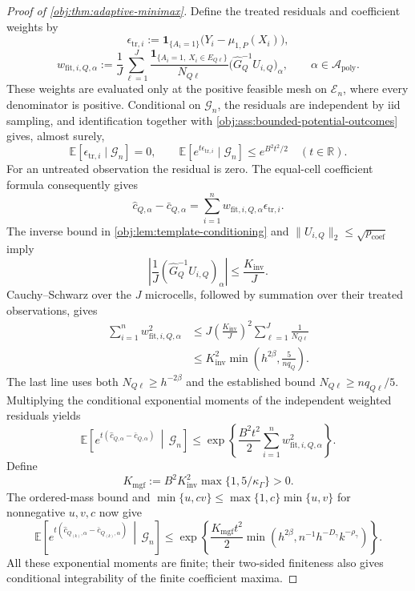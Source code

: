 \begin{proof}[Proof of \cref{obj:thm:adaptive-minimax}]
Define the treated residuals and coefficient weights by
\[
\epsilon_{\mathrm{tr},i}
:=\mathbf1_{\{A_i=1\}}\bigl(Y_i-\mu_{1,P}(X_i)\bigr),
\]
\[
w_{\mathrm{fit},i,Q,\alpha}
:=\frac1J\sum_{\ell=1}^J
\frac{\mathbf1_{\{A_i=1,\ X_i\in E_{Q\ell}\}}}{N_{Q\ell}}
\bigl(\widehat G_Q^{-1}U_{i,Q}\bigr)_\alpha,
\qquad \alpha\in\mathcal A_{\mathrm{poly}}.
\]
These weights are evaluated only at the positive feasible mesh on \(\mathcal E_n\), where every denominator is positive. Conditional on \(\mathcal G_n\), the residuals are independent by iid sampling, and identification together with \cref{obj:ass:bounded-potential-outcomes} gives, almost surely,
\[
\mathbb E[\epsilon_{\mathrm{tr},i}\mid\mathcal G_n]=0,
\qquad
\mathbb E[e^{t\epsilon_{\mathrm{tr},i}}\mid\mathcal G_n]
\le e^{B^2t^2/2}
\quad(t\in\mathbb R).
\]
For an untreated observation the residual is zero. The equal-cell coefficient formula consequently gives
\[
\widehat c_{Q,\alpha}-\bar c_{Q,\alpha}
=\sum_{i=1}^n w_{\mathrm{fit},i,Q,\alpha}
\epsilon_{\mathrm{tr},i}.
\]
The inverse bound in \cref{obj:lem:template-conditioning} and \(\|U_{i,Q}\|_2\le\sqrt{p_{\mathrm{coef}}}\) imply
\[
\left|\frac1J
(\widehat G_Q^{-1}U_{i,Q})_\alpha\right|
\le\frac{K_{\mathrm{inv}}}{J}.
\]
Cauchy--Schwarz over the \(J\) microcells, followed by summation over their treated observations, gives
\[
\begin{aligned}
\sum_{i=1}^n w_{\mathrm{fit},i,Q,\alpha}^2
&\le J\left(\frac{K_{\mathrm{inv}}}{J}\right)^2
\sum_{\ell=1}^J\frac1{N_{Q\ell}}\\
&\le K_{\mathrm{inv}}^2
\min\left(h^{2\beta},\frac5{nq_Q}\right).
\end{aligned}
\]
The last line uses both \(N_{Q\ell}\ge h^{-2\beta}\) and the established bound \(N_{Q\ell}\ge nq_{Q\ell}/5\). Multiplying the conditional exponential moments of the independent weighted residuals yields
\[
\mathbb E\!\left[
 e^{t(\widehat c_{Q,\alpha}-\bar c_{Q,\alpha})}
 \,\middle|\,\mathcal G_n\right]
\le\exp\!\left\{
\frac{B^2t^2}{2}\sum_{i=1}^n
w_{\mathrm{fit},i,Q,\alpha}^2\right\}.
\]
Define
\[
K_{\mathrm{mgf}}
:=B^2K_{\mathrm{inv}}^2\max\{1,5/\kappa_\Gamma\}>0.
\]
The ordered-mass bound and
\(\min\{u,cv\}\le\max\{1,c\}\min\{u,v\}\) for nonnegative \(u,v,c\) now give
\[
\mathbb E\!\left[
 e^{t(\widehat c_{Q_{(k)},\alpha}-\bar c_{Q_{(k)},\alpha})}
 \,\middle|\,\mathcal G_n\right]
\le\exp\!\left\{
\frac{K_{\mathrm{mgf}}t^2}{2}
\min\left(h^{2\beta},n^{-1}h^{-D_\gamma}k^{-\rho_\gamma}\right)
\right\}.
\]
All these exponential moments are finite; their two-sided finiteness also gives conditional integrability of the finite coefficient maxima.


\end{proof}
